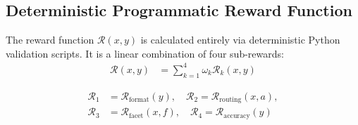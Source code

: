 \documentclass{article}
\theoremstyle{plain}
\theoremstyle{definition}
\theoremstyle{remark}
\begin{document}
\subsection{Deterministic Programmatic Reward Function}
The reward function $\mathcal{R}(x, y)$ is calculated entirely via deterministic Python validation scripts. It is a linear combination of four sub-rewards:
\begin{align}
\mathcal{R}(x, y)
&=
\sum_{k=1}^{4} \omega_k \mathcal{R}_k(x, y)
\end{align}

\begin{align}
\mathcal{R}_1 &= \mathcal{R}_{\text{format}}(y), \quad
\mathcal{R}_2 = \mathcal{R}_{\text{routing}}(x, a), \\
\mathcal{R}_3 &= \mathcal{R}_{\text{facet}}(x, f), \quad
\mathcal{R}_4 = \mathcal{R}_{\text{accuracy}}(y)
\end{align}

\end{document}
